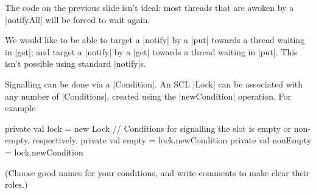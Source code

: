 
\begin{slide}

The code on the previous slide isn't ideal: most threads that are awoken by a
|notifyAll| will be forced to wait again.

We would like to be able to target a |notify| by a |put| towards a thread
waiting in |get|; and target a |notify| by a |get| towards a thread
waiting in |put|.  This isn't possible using standard |notify|s.
\end{slide}







\begin{slide}

Signalling can be done via a |Condition|.  An SCL |Lock| can be
associated with any number of |Conditions|, created using the |newCondition|
operation.  For example
%
\begin{scala}
  private val lock = new Lock
  // Conditions for signalling the slot is empty or non-empty, respectively.
  private val empty = lock.newCondition
  private val nonEmpty = lock.newCondition
\end{scala}
%
(Choose good names for your conditions, and write comments to make clear their
roles.)
\end{slide}


